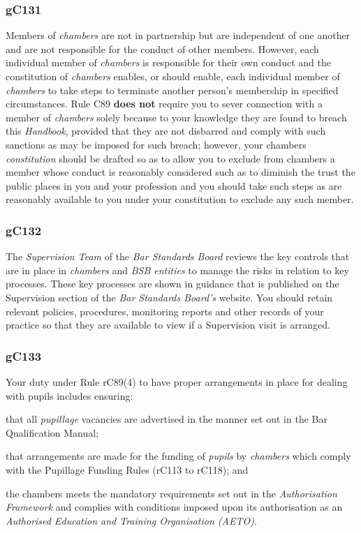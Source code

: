 

\subsubsection{\color{darkgrey}gC131}

Members of \emph{chambers} are not in partnership but are independent of
one another and are not responsible for the conduct of other members.
However, each individual member of \emph{chambers} is responsible for
their own conduct and the constitution of \emph{chambers} enables, or
should enable, each individual member of \emph{chambers} to take steps
to terminate another person's membership in specified circumstances.
Rule C89 \textcolor{myred}{\textbf{does not}} require you to sever connection with a member of
\emph{chambers} solely because to your knowledge they are found to
breach this \emph{Handbook}, provided that they are not disbarred and
comply with such sanctions as may be imposed for such breach; however,
your chambers \emph{constitution} should be drafted so as to allow you
to exclude from chambers a member whose conduct is reasonably considered
such as to diminish the trust the public places in you and your
profession and you should take such steps as are reasonably available to
you under your constitution to exclude any such member.

\subsubsection{\color{darkgrey}gC132}

The \emph{Supervision Team} of the \emph{Bar Standards Board} reviews
the key controls that are in place in \emph{chambers} and \emph{BSB
entities} to manage the risks in relation to key processes. These key
processes are shown in guidance that is published on the Supervision
section of the \emph{Bar Standards Board's} website. You should retain
relevant policies, procedures, monitoring reports and other records of
your practice so that they are available to view if a Supervision visit
is arranged.

\subsubsection{\color{darkgrey}gC133}

Your duty under Rule rC89(4) to have proper arrangements in place for
dealing with pupils includes ensuring:
\begin{numlist}\item that all \emph{pupillage} vacancies are advertised in the manner set
out in the Bar Qualification Manual;
\item that arrangements are made for the funding of \emph{pupils} by
\emph{chambers} which comply with the Pupillage Funding Rules (rC113 to
rC118); and
\item the chambers meets the mandatory requirements set out in the
\emph{Authorisation Framework} and complies with conditions imposed upon
its authorisation as an \emph{Authorised Education and Training
Organisation (AETO)}.
\end{numlist}
